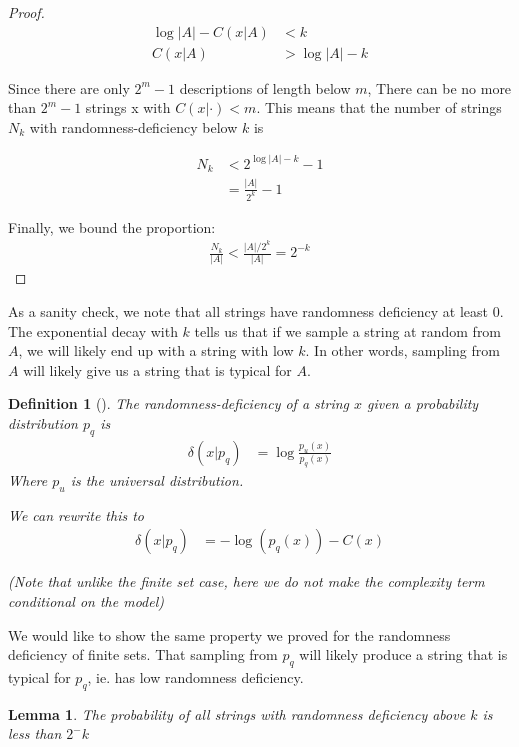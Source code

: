 \documentclass[10pt,a4paper,oneside]{article}
\newtheorem{lma}{Lemma}
\newtheorem{dfn}{Definition}
\begin{document}
\begin{proof}
\begin{align*}
\log |A| - C(x|A) &< k \\
C(x|A) &> \log |A| - k 
\end{align*}

Since there are only $2^m-1$ descriptions of length below $m$, There can be no more than $2^m-1$ strings x with $C(x|\cdot) < m$. This means that the number of strings $N_k$ with randomness-deficiency below $k$ is

\begin{align*}
N_k &< 2^{\log |A| - k}-1 \\
&= \frac{|A|}{2^k} - 1
\end{align*}

Finally, we bound the proportion:
\begin{align*}
\frac{N_k}{|A|} < \frac{|A|/2^k}{|A|} =  2^{-k}
\end{align*}
\end{proof}

As a sanity check, we note that all strings have randomness deficiency at least $0$. The exponential decay with $k$ tells us that if we sample a string at random from $A$, we will likely end up with a string with low $k$. In other words, sampling from $A$ will likely give us a string that is typical for $A$.

\begin{dfn}[{\cite{antunes2009depth}}]
The randomness-deficiency of a string $x$ given a probability distribution $p_q$ is 
\begin{align*}
\delta(x|p_q) &= \log \frac{p_u(x)}{p_q(x)}
\end{align*} 
Where $p_u$ is the universal distribution.

We can rewrite this to 
\begin{align*}
\delta(x|p_q) &= - \log(p_q(x)) - C(x) 
\end{align*}

(Note that unlike the finite set case, here we do not make the complexity term conditional on the model)

\end{dfn}

We would like to show the same property we proved for the randomness deficiency of finite sets. That sampling from $p_q$ will likely produce a string that is typical for $p_q$, ie. has low randomness deficiency.

\begin{lma}
The probability of all strings with randomness deficiency above $k$ is less than $2^-k$
\end{lma}
\end{document}
